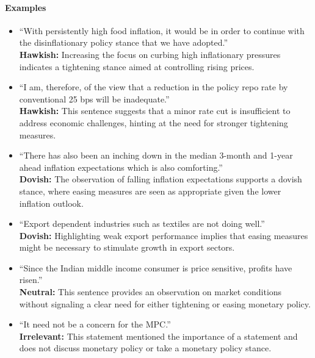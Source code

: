 \paragraph{Examples}
\begin{itemize}
    \item “With persistently high food inflation, it would be in order to continue with the disinflationary policy stance that we have adopted.” \\
    \textbf{Hawkish:} Increasing the focus on curbing high inflationary pressures indicates a tightening stance aimed at controlling rising prices.
    
    \item “I am, therefore, of the view that a reduction in the policy repo rate by conventional 25 bps will be inadequate.” \\
    \textbf{Hawkish:} This sentence suggests that a minor rate cut is insufficient to address economic challenges, hinting at the need for stronger tightening measures.
    
    \item “There has also been an inching down in the median 3-month and 1-year ahead inflation expectations which is also comforting.” \\
    \textbf{Dovish:} The observation of falling inflation expectations supports a dovish stance, where easing measures are seen as appropriate given the lower inflation outlook.
    
    \item “Export dependent industries such as textiles are not doing well.” \\
    \textbf{Dovish:} Highlighting weak export performance implies that easing measures might be necessary to stimulate growth in export sectors.
    
    \item “Since the Indian middle income consumer is price sensitive, profits have risen.” \\
    \textbf{Neutral:} This sentence provides an observation on market conditions without signaling a clear need for either tightening or easing monetary policy.

    \item “It need not be a concern for the MPC.” \\
    \textbf{Irrelevant:} This statement mentioned the importance of a statement and does not discuss monetary policy or take a monetary policy stance.
\end{itemize}

